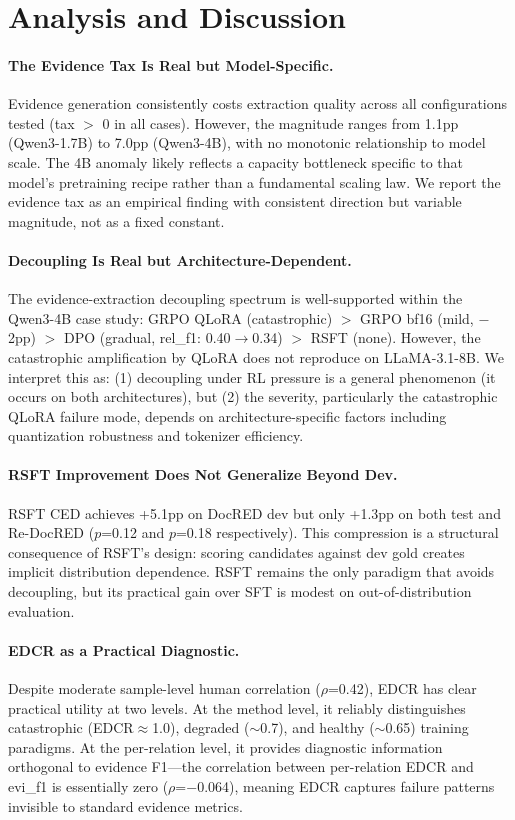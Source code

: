 \documentclass[11pt,a4paper]{article}
\newcommand{\edcr}{EDCR}
\newcommand{\ced}{CED}
\begin{document}
\section{Analysis and Discussion}
\label{sec:discussion}

\paragraph{The Evidence Tax Is Real but Model-Specific.}
Evidence generation consistently costs extraction quality across all configurations tested (tax $>$ 0 in all cases).
However, the magnitude ranges from 1.1pp (Qwen3-1.7B) to 7.0pp (Qwen3-4B), with no monotonic relationship to model scale.
The 4B anomaly likely reflects a capacity bottleneck specific to that model's pretraining recipe rather than a fundamental scaling law.
We report the evidence tax as an empirical finding with consistent direction but variable magnitude, not as a fixed constant.

\paragraph{Decoupling Is Real but Architecture-Dependent.}
The evidence-extraction decoupling spectrum is well-supported within the Qwen3-4B case study: GRPO QLoRA (catastrophic) $>$ GRPO bf16 (mild, $-$2pp) $>$ DPO (gradual, rel\_f1: 0.40$\to$0.34) $>$ RSFT (none).
However, the catastrophic amplification by QLoRA does not reproduce on LLaMA-3.1-8B.
We interpret this as: (1) decoupling under RL pressure is a general phenomenon (it occurs on both architectures), but (2) the severity, particularly the catastrophic QLoRA failure mode, depends on architecture-specific factors including quantization robustness and tokenizer efficiency.

\paragraph{RSFT Improvement Does Not Generalize Beyond Dev.}
RSFT \ced{} achieves +5.1pp on DocRED dev but only +1.3pp on both test and Re-DocRED ($p$=0.12 and $p$=0.18 respectively).
This compression is a structural consequence of RSFT's design: scoring candidates against dev gold creates implicit distribution dependence.
RSFT remains the only paradigm that avoids decoupling, but its practical gain over SFT is modest on out-of-distribution evaluation.

\paragraph{EDCR as a Practical Diagnostic.}
Despite moderate sample-level human correlation ($\rho$=0.42), \edcr{} has clear practical utility at two levels.
At the method level, it reliably distinguishes catastrophic (\edcr{}$\approx$1.0), degraded ($\sim$0.7), and healthy ($\sim$0.65) training paradigms.
At the per-relation level, it provides diagnostic information orthogonal to evidence F1---the correlation between per-relation \edcr{} and evi\_f1 is essentially zero ($\rho$=$-$0.064), meaning \edcr{} captures failure patterns invisible to standard evidence metrics.
\end{document}
